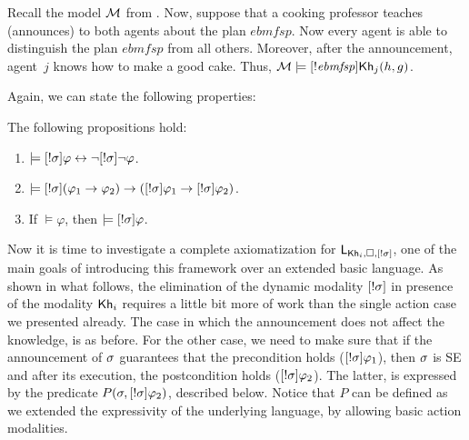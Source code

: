 \medskip 

\begin{example}\label{ex:sref}
Recall the model $\mathcal{M}$ from .
Now, suppose that a cooking professor teaches (announces) to both agents about the plan $\mathit{ebmfsp}$.
Now every agent is able to distinguish the plan $\mathit{ebmfsp}$ from all others.
Moreover, after the announcement, agent~$j$ knows how to make a good cake.
Thus, $\mathcal{M} \models [!\mathit{ebmfsp}] {\sf Kh}_j(h,g)$.
\end{example}

Again, we can state the following properties:

\medskip 

\begin{proposition}
The following propositions hold:
\begin{enumerate}
\item $\models [!\sigma]\varphi \leftrightarrow \neg[!\sigma]\neg\varphi$. 
\item $\models [!\sigma](\varphi_1 \rightarrow \varphi_2) \rightarrow ([!\sigma]\varphi_1 \rightarrow [!\sigma]\varphi_2)$.
\item If $\models \varphi$, then $\models [!\sigma]\varphi$.
\end{enumerate}
\end{proposition}

Now it is time to investigate a complete axiomatization for $\mathsf{L}_{{\sf Kh}_i,\square,[!\sigma]}$, one of the main goals of introducing this framework over an extended basic language. As shown in what follows, the elimination of the dynamic modality $[!\sigma]$ in presence of the modality ${\sf Kh}_i$ requires a little bit more of work than the single action case we presented already.  The case in which the announcement does not affect the knowledge, is as before. For the other case, we need to make sure that if the announcement of $\sigma$ guarantees that the precondition holds ($[!\sigma]\varphi_1$), then $\sigma$ is SE and after its execution, the postcondition holds ($[!\sigma]\varphi_2$). The latter, is expressed by the predicate $P(\sigma,[!\sigma]\varphi_2)$, described below. Notice that $P$ can be defined as we extended the expressivity of the underlying language, by allowing basic action modalities.

